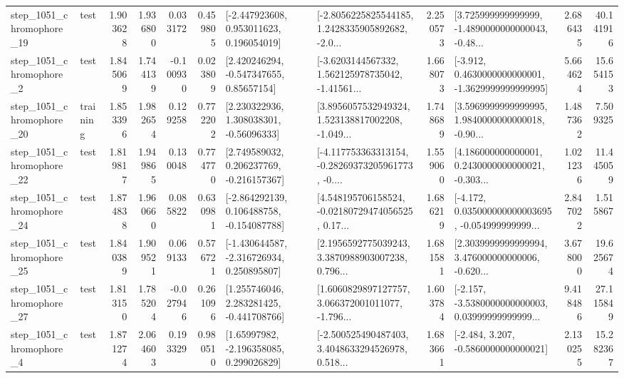 \begin{tabular}{llrrrrllrlrr}
 step\_1051\_chromophore\_19 &      test &      1.903628 &    1.936800 &      0.033172 &  0.459805 &    [-2.447923608, 0.953011623, 0.196054019] &  [-2.8056225825544185, 1.2428335905892682, -2.0... &       2.250573 &  [3.725999999999999, -1.4890000000000043, -0.48... &            2.686435 &         40.141916 \\
  step\_1051\_chromophore\_2 &      test &      1.845069 &    1.744139 &     -0.100930 &  0.023809 &     [2.420246294, -0.547347655, 0.85657154] &  [-3.6203144567332, 1.562125978735042, -1.41561... &       1.668073 &  [-3.912, 0.4630000000000001, -1.3629999999999995] &            5.664624 &         15.654153 \\
 step\_1051\_chromophore\_20 &  training &      1.853396 &    1.982654 &      0.129258 &  0.772202 &     [2.230322936, 1.308038301, -0.56096333] &  [3.8956057532949324, 1.523138817002208, -1.049... &       1.748689 &  [3.5969999999999995, 1.9840000000000018, -0.90... &            1.487362 &          7.509325 \\
 step\_1051\_chromophore\_22 &      test &      1.819817 &    1.949865 &      0.130048 &  0.774770 &    [2.749589032, 0.206237769, -0.216157367] &  [-4.117753363313154, -0.28269373205961773, -0.... &       1.559060 &  [4.186000000000001, 0.2430000000000021, -0.303... &            1.021236 &         11.445059 \\
 step\_1051\_chromophore\_24 &      test &      1.874838 &    1.960660 &      0.085822 &  0.630981 &   [-2.864292139, 0.106488758, -0.154087788] &  [4.548195706158524, -0.02180729474056525, 0.17... &       1.686219 &  [-4.172, 0.035000000000003695, -0.054999999999... &            2.847022 &          1.515867 \\
 step\_1051\_chromophore\_25 &      test &      1.840389 &    1.909521 &      0.069133 &  0.576721 &   [-1.430644587, -2.316726934, 0.250895807] &  [2.1956592775039243, 3.3870988903007238, 0.796... &       1.681581 &  [2.3039999999999994, 3.476000000000006, -0.620... &            3.678000 &         19.625674 \\
 step\_1051\_chromophore\_27 &      test &      1.813150 &    1.785204 &     -0.027946 &  0.261096 &    [1.255746046, 2.283281425, -0.441708766] &  [1.6060829897127757, 3.066372001011077, -1.796... &       1.603784 &  [-2.157, -3.5380000000000003, 0.03999999999999... &            9.418486 &         27.115849 \\
  step\_1051\_chromophore\_4 &      test &      1.871274 &    2.064603 &      0.193329 &  0.980510 &     [1.65997982, -2.196358085, 0.299026829] &  [-2.500525490487403, 3.4048633294526978, 0.518... &       1.683661 &               [-2.484, 3.207, -0.5860000000000021] &            2.130255 &         15.282367 \\

\end{tabular}
